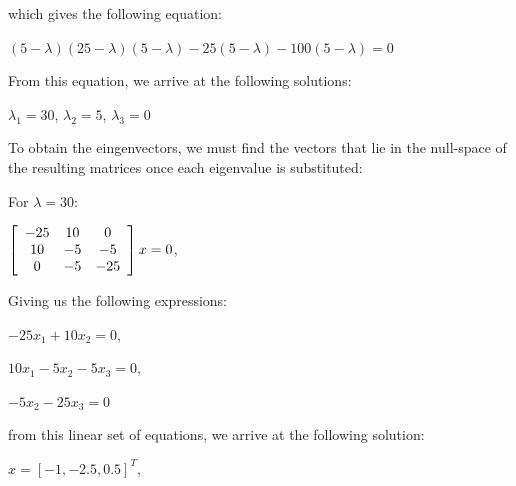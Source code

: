 \documentclass[]{article}
\begin{document}
\vspace{0.5em}

which gives the following equation:

\vspace{0.5em}

\centerline {
	$(5- \lambda) (25 - \lambda)(5 - \lambda) - 25(5 - \lambda) - 100(5 - \lambda) = 0 $
}

\vspace{0.5em}

From this equation, we arrive at the following solutions: 

\vspace{0.5em}

\centerline {
	$\lambda_{1} = 30$, $\lambda_{2} = 5$, $\lambda_{3} = 0$ 
}

\vspace{0.5em}

To obtain the eingenvectors, we must find the vectors that lie in the null-space of the resulting matrices once
each eigenvalue is substituted:

For $\lambda = 30$: 

\vspace{0.5em}

\centerline{ $\left[ {\begin{array}{*{20}c}
		-25 & 10 & 0 \\
		10 & -5 & -5 \\ 
		0 & -5 & -25   
		\end{array} } \right] x = 0$,  }

Giving us the following expressions: 

\vspace{0.5em}

\centerline {
	$-25x_{1} + 10x_{2} = 0$, 
}

\vspace{0.5em}

\centerline {
	$10x_{1} - 5x_{2} - 5x_{3} =0$, 
}

\vspace{0.5em}

\centerline {
	$-5x_{2} - 25x_{3} = 0$	
}

\vspace{0.5em}

from this linear set of equations, we arrive at the following solution: 

\centerline {
	$x = [-1, -2.5, 0.5]^T$,
}

\vspace{0.5em}
\end{document}
